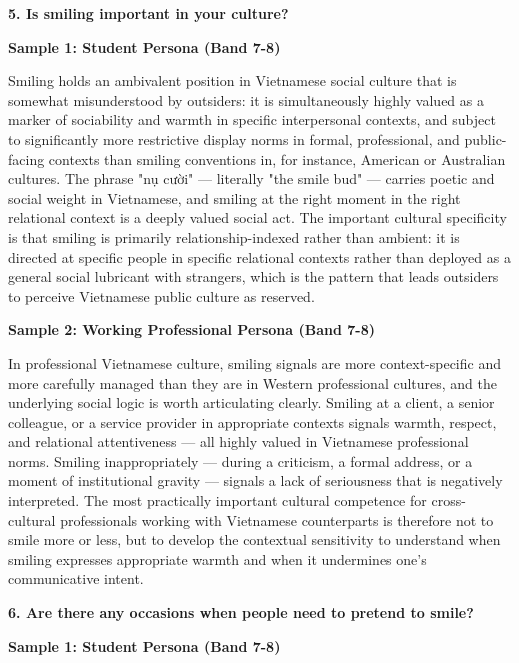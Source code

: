 \separator

\begin{ieltsquestion}
\textbf{5. Is smiling important in your culture?}
\end{ieltsquestion}
\textbf{Sample 1: Student Persona (Band 7-8)}

Smiling holds an ambivalent position in Vietnamese social culture that is somewhat misunderstood by outsiders: it is simultaneously highly valued as a marker of sociability and warmth in specific interpersonal contexts, and subject to significantly more restrictive display norms in formal, professional, and public-facing contexts than smiling conventions in, for instance, American or Australian cultures. The phrase "nụ cười" — literally "the smile bud" — carries poetic and social weight in Vietnamese, and smiling at the right moment in the right relational context is a deeply valued social act. The important cultural specificity is that smiling is primarily relationship-indexed rather than ambient: it is directed at specific people in specific relational contexts rather than deployed as a general social lubricant with strangers, which is the pattern that leads outsiders to perceive Vietnamese public culture as reserved.

\textbf{Sample 2: Working Professional Persona (Band 7-8)}

In professional Vietnamese culture, smiling signals are more context-specific and more carefully managed than they are in Western professional cultures, and the underlying social logic is worth articulating clearly. Smiling at a client, a senior colleague, or a service provider in appropriate contexts signals warmth, respect, and relational attentiveness — all highly valued in Vietnamese professional norms. Smiling inappropriately — during a criticism, a formal address, or a moment of institutional gravity — signals a lack of seriousness that is negatively interpreted. The most practically important cultural competence for cross-cultural professionals working with Vietnamese counterparts is therefore not to smile more or less, but to develop the contextual sensitivity to understand when smiling expresses appropriate warmth and when it undermines one's communicative intent.

\separator

\begin{ieltsquestion}
\textbf{6. Are there any occasions when people need to pretend to smile?}
\end{ieltsquestion}
\textbf{Sample 1: Student Persona (Band 7-8)}

